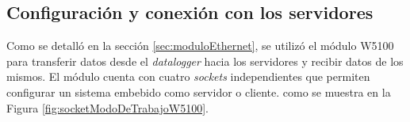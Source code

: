 



\subsection{Configuración y conexión con los servidores}\label{sec:confServers}
Como se detalló en la sección \ref{sec:moduloEthernet}, se utilizó el módulo W5100 para transferir datos desde el \textit{datalogger} hacia los servidores y recibir datos de los mismos. El módulo cuenta con cuatro \textit{sockets} independientes que permiten configurar un sistema embebido como servidor o cliente.
como se muestra en la Figura \ref{fig:socketModoDeTrabajoW5100}.

